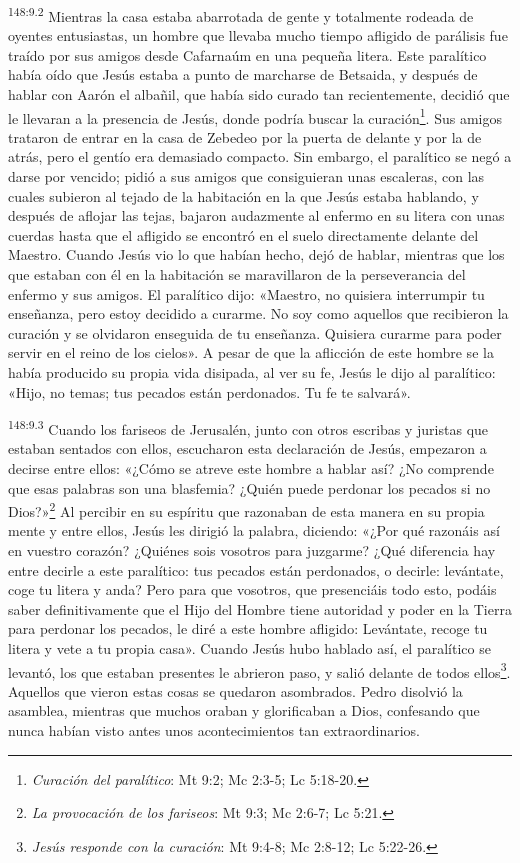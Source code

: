 \par
\textsuperscript{148:9.2} Mientras la casa estaba abarrotada de gente y totalmente rodeada de oyentes entusiastas, un hombre que llevaba mucho tiempo afligido de parálisis fue traído por sus amigos desde Cafarnaúm en una pequeña litera. Este paralítico había oído que Jesús estaba a punto de marcharse de Betsaida, y después de hablar con Aarón el albañil, que había sido curado tan recientemente, decidió que le llevaran a la presencia de Jesús, donde podría buscar la curación\footnote{\textit{Curación del paralítico}: Mt 9:2; Mc 2:3-5; Lc 5:18-20.}. Sus amigos trataron de entrar en la casa de Zebedeo por la puerta de delante y por la de atrás, pero el gentío era demasiado compacto. Sin embargo, el paralítico se negó a darse por vencido; pidió a sus amigos que consiguieran unas escaleras, con las cuales subieron al tejado de la habitación en la que Jesús estaba hablando, y después de aflojar las tejas, bajaron audazmente al enfermo en su litera con unas cuerdas hasta que el afligido se encontró en el suelo directamente delante del Maestro. Cuando Jesús vio lo que habían hecho, dejó de hablar, mientras que los que estaban con él en la habitación se maravillaron de la perseverancia del enfermo y sus amigos. El paralítico dijo: «Maestro, no quisiera interrumpir tu enseñanza, pero estoy decidido a curarme. No soy como aquellos que recibieron la curación y se olvidaron enseguida de tu enseñanza. Quisiera curarme para poder servir en el reino de los cielos». A pesar de que la aflicción de este hombre se la había producido su propia vida disipada, al ver su fe, Jesús le dijo al paralítico: «Hijo, no temas; tus pecados están perdonados. Tu fe te salvará».

\par
\textsuperscript{148:9.3} Cuando los fariseos de Jerusalén, junto con otros escribas y juristas que estaban sentados con ellos, escucharon esta declaración de Jesús, empezaron a decirse entre ellos: «¿Cómo se atreve este hombre a hablar así? ¿No comprende que esas palabras son una blasfemia? ¿Quién puede perdonar los pecados si no Dios?»\footnote{\textit{La provocación de los fariseos}: Mt 9:3; Mc 2:6-7; Lc 5:21.} Al percibir en su espíritu que razonaban de esta manera en su propia mente y entre ellos, Jesús les dirigió la palabra, diciendo: «¿Por qué razonáis así en vuestro corazón? ¿Quiénes sois vosotros para juzgarme? ¿Qué diferencia hay entre decirle a este paralítico: tus pecados están perdonados, o decirle: levántate, coge tu litera y anda? Pero para que vosotros, que presenciáis todo esto, podáis saber definitivamente que el Hijo del Hombre tiene autoridad y poder en la Tierra para perdonar los pecados, le diré a este hombre afligido: Levántate, recoge tu litera y vete a tu propia casa». Cuando Jesús hubo hablado así, el paralítico se levantó, los que estaban presentes le abrieron paso, y salió delante de todos ellos\footnote{\textit{Jesús responde con la curación}: Mt 9:4-8; Mc 2:8-12; Lc 5:22-26.}. Aquellos que vieron estas cosas se quedaron asombrados. Pedro disolvió la asamblea, mientras que muchos oraban y glorificaban a Dios, confesando que nunca habían visto antes unos acontecimientos tan extraordinarios.

